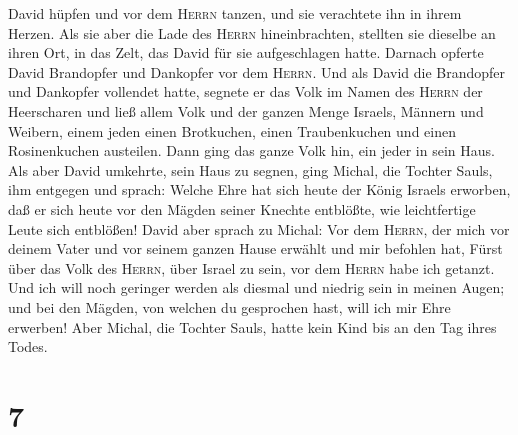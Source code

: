 David hüpfen und vor dem \textsc{Herrn} tanzen, und sie verachtete ihn
in ihrem Herzen.  Als sie aber die Lade des
\textsc{Herrn} hineinbrachten, stellten sie dieselbe an ihren Ort, in
das Zelt, das David für sie aufgeschlagen hatte. Darnach opferte David
Brandopfer und Dankopfer vor dem \textsc{Herrn}.  Und als
David die Brandopfer und Dankopfer vollendet hatte, segnete er das Volk
im Namen des \textsc{Herrn} der Heerscharen  und ließ
allem Volk und der ganzen Menge Israels, Männern und Weibern, einem
jeden einen Brotkuchen, einen Traubenkuchen und einen Rosinenkuchen
austeilen. Dann ging das ganze Volk hin, ein jeder in sein Haus.
 Als aber David umkehrte, sein Haus zu segnen, ging
Michal, die Tochter Sauls, ihm entgegen und sprach: Welche Ehre hat sich
heute der König Israels erworben, daß er sich heute vor den Mägden
seiner Knechte entblößte, wie leichtfertige Leute sich entblößen!
 David aber sprach zu Michal: Vor dem \textsc{Herrn}, der
mich vor deinem Vater und vor seinem ganzen Hause erwählt und mir
befohlen hat, Fürst über das Volk des \textsc{Herrn}, über Israel zu
sein,  vor dem \textsc{Herrn} habe ich getanzt. Und ich
will noch geringer werden als diesmal und niedrig sein in meinen Augen;
und bei den Mägden, von welchen du gesprochen hast, will ich mir Ehre
erwerben!  Aber Michal, die Tochter Sauls, hatte kein
Kind bis an den Tag ihres Todes.

\hypertarget{section-6}{%
\section{7}\label{section-6}}

